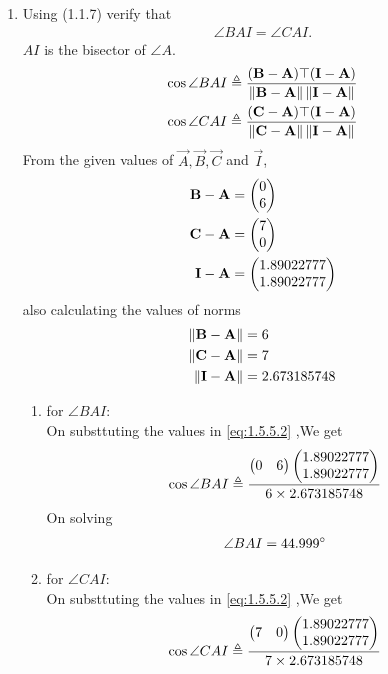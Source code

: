 \documentclass[11pt]{book}
\begin{document}
\begin{enumerate}[label=\thesection.\arabic*.,ref=\thesection.\theenumi]
\item Using (1.1.7) verify that 
\begin{align}
\angle BAI = \angle CAI.
\end{align}
$AI$ is the bisector of $\angle A$. \\
\solution
\begin{align}
\label{eq:1.5.5.2}
\cos{\angle BAI} \triangleq \frac{(\vec{B}-\vec{A})\top(\vec{I}-\vec{A})}{\norm{\vec{B}-\vec{A}}\norm{\vec{I}-\vec{A}}} \\
\cos{\angle CAI} \triangleq \frac{(\vec{C}-\vec{A})\top(\vec{I}-\vec{A})}{\norm{\vec{C}-\vec{A}}\norm{\vec{I}-\vec{A}}} 
\end{align}
From the given values of $\vec{A},\vec{B},\vec{C}$ and $\vec{I}$,
\begin{align}
	\mathbf{B}-\mathbf{A} &=\begin{pmatrix}0\\6\end{pmatrix} \\
	\mathbf{C}-\mathbf{A}&= \begin{pmatrix}7\\0\end{pmatrix} \\
 \mathbf{I}-\mathbf{A}  &=\begin{pmatrix}1.89022777 \\ 1.89022777\end{pmatrix}
\end{align}
also calculating the values of norms
\begin{align}
	\left\lVert\mathbf{B}-\mathbf{A}\right\rVert &= 6 \\
	\left\lVert\mathbf{C}-\mathbf{A}\right\rVert &= 7 \\
 	\left\lVert\mathbf{I}-\mathbf{A}\right\rVert &= 2.673185748 \\
\end{align}
\begin{enumerate}
    \item for $\angle BAI$: \\
    On substtuting the values in  \eqref{eq:1.5.5.2} ,We get 
    \begin{align}
	    \cos{\angle BAI} \triangleq \frac{\begin{pmatrix} 0 & 6\end{pmatrix}\begin{pmatrix}1.89022777\\ 1.89022777\end{pmatrix}}{ 6\times 2.673185748} \\
    \end{align}
    On solving 
    \begin{align}
        \angle BAI = 44.999\degree
    \end{align}
       \item for $\angle CAI$: \\
    On substtuting the values in  \eqref{eq:1.5.5.2} ,We get 
    \begin{align}
        \cos{\angle CAI} \triangleq \frac{\myvec{ 7 & 0}\myvec{1.89022777 \\ 1.89022777}}{7\times 2.673185748} \\

\end{align}
\end{enumerate}
\end{enumerate}
\end{document}
